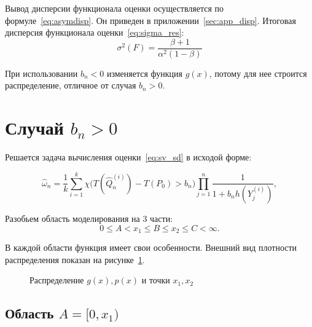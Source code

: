 \documentclass[12pt, specialist, subf, substylefile = spbu.rtx]{disser}
\begin{document}
Вывод дисперсии функционала оценки осуществляется по формуле~\eqref{eq:asymdisp}. Он приведен в приложении~\ref{sec:app_disp}. Итоговая дисперсия функционала оценки~\eqref{eq:sigma_res}:
$$
\sigma^2(F)= \frac{\beta + 1}{\alpha^2(1-\beta)}
$$

При использовании $b_n < 0$ изменяется функция $g(x)$, потому для нее строится распределение, отличное от случая $b_n > 0$.


\section{Случай $b_n > 0$}

Решается задача вычисления оценки~\eqref{eq:sv_sd} в исходой форме:

\begin{equation}\label{eq:est_plus}
\hat{\omega}_n=\frac{1}{k} \sum\limits_{i=1}^{k}
\chi \big(T(\hat{Q}^{(i)}_n)-T(P_0) > b_n\big)
\prod\limits_{j=1}^{n} 
\frac{1}{1+b_nh(Y_j^{(i)})},
\end{equation}

Разобьем область моделирования на 3 части: 
$$0 \le A < x_1 \le B \le x_2 \le C < \infty.$$

В каждой области функция имеет свои особенности. Внешний вид плотности распределения показан на рисунке~\ref{ris:plot1}. 

\begin{figure}[h]
\caption{Распределение $g(x), p(x)$ и точки $x_1, x_2$}
\label{ris:plot1}
\end{figure}



\subsection{Область $A=[0, x_1)$}
\end{document}
